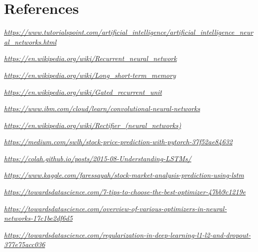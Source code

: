 \documentclass{article}
\begin{document}
\section{References}


\textit{\url{https://www.tutorialspoint.com/artificial_intelligence/artificial_intelligence_neural_networks.html}}

\textit{\url{https://en.wikipedia.org/wiki/Recurrent_neural_network}}

\textit{\url{https://en.wikipedia.org/wiki/Long_short-term_memory}}

\textit{\url{https://en.wikipedia.org/wiki/Gated_recurrent_unit}}

\textit{\url{https://www.ibm.com/cloud/learn/convolutional-neural-networks}}

\textit{\url{https://en.wikipedia.org/wiki/Rectifier_(neural_networks)}}

\textit{\url{https://medium.com/swlh/stock-price-prediction-with-pytorch-37f52ae84632}}

\textit{\url{https://colah.github.io/posts/2015-08-Understanding-LSTMs/}}

\textit{\url{https://www.kaggle.com/faressayah/stock-market-analysis-prediction-using-lstm}}

\textit{\url{https://towardsdatascience.com/7-tips-to-choose-the-best-optimizer-47bb9c1219e}}

\textit{\url{https://towardsdatascience.com/overview-of-various-optimizers-in-neural-networks-17c1be2df6d5}}

\textit{\url{https://towardsdatascience.com/regularization-in-deep-learning-l1-l2-and-dropout-377e75acc036}}
\end{document}
